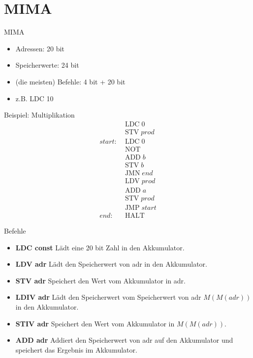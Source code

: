 \section{MIMA}

\begin{frame}{MIMA}
  \begin{itemize}
    \item Adressen: 20 bit
    \item Speicherwerte: 24 bit
    \item (die meisten) Befehle: 4 bit + 20 bit
    \item z.B. LDC 10
  \end{itemize}
\end{frame}

\begin{frame}{Beispiel: Multiplikation}
  \begin{align*}
    &\text{LDC}\; 0\\
    &\text{STV}\; prod\\
    start:\;&\text{LDC}\; 0\\
    &\text{NOT}\; \\
    &\text{ADD}\; b\\
    &\text{STV}\; b\\
    &\text{JMN}\; end\\
    &\text{LDV}\; prod\\
    &\text{ADD}\; a\\
    &\text{STV}\; prod\\
    &\text{JMP}\; start\\
    end:\;&\text{HALT}
  \end{align*}
\end{frame}

\begin{frame}{Befehle}
  \begin{itemize}
    \item \textbf{LDC const} Lädt eine 20 bit Zahl in den Akkumulator.
    \pause
    \item \textbf{LDV adr} Lädt den Speicherwert von adr in den Akkumulator.
    \pause
    \item \textbf{STV adr} Speichert den Wert vom Akkumulator in adr.
    \pause
    \item \textbf{LDIV adr} Lädt den Speicherwert vom Speicherwert von adr $M(M(adr))$ in den Akkumulator.
    \pause
    \item \textbf{STIV adr} Speichert den Wert vom Akkumulator in $M(M(adr))$.
    \pause
    \item \textbf{ADD adr} Addiert den Speicherwert von adr auf den Akkumulator und speichert das Ergebnis im Akkumulator.
  \end{itemize}
\end{frame}


